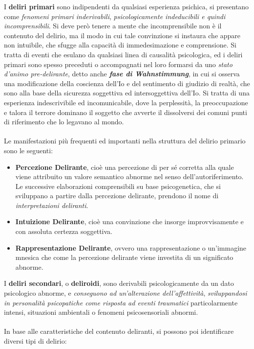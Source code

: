 I \textbf{deliri primari} sono indipendenti da qualsiasi esperienza
psichica, si presentano come \emph{fenomeni primari inderivabili},
\emph{psicologicamente indeducibili e quindi incomprensibili}. Si deve
però tenere a mente che incomprensibile non è il contenuto del delirio,
ma il modo in cui tale convinzione si instaura che appare non intuibile,
che sfugge alla capacità di immedesimazione e comprensione. Si tratta di
eventi che esulano da qualsiasi linea di causalità psicologica, ed i
deliri primari sono spesso preceduti o accompagnati nel loro formarsi da
uno \emph{stato d'animo pre-delirante}, detto anche \textbf{\emph{fase
di Wahnstimmung}}, in cui si osserva una modificazione della coscienza
dell'Io e del sentimento di giudizio di realtà, che sono alla base della
sicurezza soggettiva ed intersoggettiva dell'Io. Si tratta di una
esperienza indescrivibile ed incomunicabile, dove la perplessità, la
preoccupazione e talora il terrore dominano il soggetto che avverte il
dissolversi dei comuni punti di riferimento che lo legavano al mondo.
\\\\
Le manifestazioni più frequenti ed importanti nella struttura del
delirio primario sono le seguenti:

\begin{itemize}
\item
  \textbf{Percezione Delirante}, cioè una percezione di per sé corretta
  alla quale viene attribuito un valore semantico abnorme nel senso
  dell'autoriferimento. Le successive elaborazioni comprensibili su base
  psicogenetica, che si sviluppano a partire dalla percezione delirante,
  prendono il nome di \emph{interpretazioni deliranti}.
\item
  \textbf{Intuizione Delirante}, cioè una convinzione che insorge
  improvvisamente e con assoluta certezza soggettiva.
\item
  \textbf{Rappresentazione Delirante}, ovvero una rappresentazione o
  un'immagine mnesica che come la percezione delirante viene investita
  di un significato abnorme.
\end{itemize}

I \textbf{deliri secondari}, o \textbf{deliroidi}, sono derivabili
psicologicamente da un dato psicologico abnorme, e \emph{conseguono ad
un'alterazione dell'affettività}, \emph{sviluppandosi in personalità
psicopatiche come risposta ad eventi traumatici} particolarmente
intensi, situazioni ambientali o fenomeni psicosensoriali abnormi.
\\\\
In base alle caratteristiche del contenuto deliranti, si possono poi
identificare diversi tipi di delirio:

